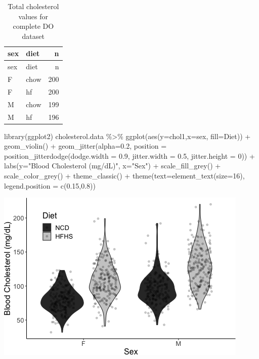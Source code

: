 \documentclass[
]{article}
\newenvironment{Shaded}{\begin{snugshade}}{\end{snugshade}}
\newcommand{\AttributeTok}[1]{\textcolor[rgb]{0.77,0.63,0.00}{#1}}
\newcommand{\DecValTok}[1]{\textcolor[rgb]{0.00,0.00,0.81}{#1}}
\newcommand{\FloatTok}[1]{\textcolor[rgb]{0.00,0.00,0.81}{#1}}
\newcommand{\FunctionTok}[1]{\textcolor[rgb]{0.00,0.00,0.00}{#1}}
\newcommand{\NormalTok}[1]{#1}
\newcommand{\SpecialCharTok}[1]{\textcolor[rgb]{0.00,0.00,0.00}{#1}}
\newcommand{\StringTok}[1]{\textcolor[rgb]{0.31,0.60,0.02}{#1}}
\begin{document}
\begin{longtable}[]{@{}llr@{}}
\caption{Total cholesterol values for complete DO
dataset}\tabularnewline
\toprule()
sex & diet & n \\
\midrule()
\endfirsthead
\toprule()
sex & diet & n \\
\midrule()
\endhead
F & chow & 200 \\
F & hf & 200 \\
M & chow & 199 \\
M & hf & 196 \\
\bottomrule()
\end{longtable}

\begin{Shaded}
\begin{Highlighting}[]
\FunctionTok{library}\NormalTok{(ggplot2)}
\NormalTok{cholesterol.data }\SpecialCharTok{\%\textgreater{}\%}
  \FunctionTok{ggplot}\NormalTok{(}\FunctionTok{aes}\NormalTok{(}\AttributeTok{y=}\NormalTok{chol1,}\AttributeTok{x=}\NormalTok{sex,}
             \AttributeTok{fill=}\NormalTok{Diet)) }\SpecialCharTok{+}
  \FunctionTok{geom\_violin}\NormalTok{() }\SpecialCharTok{+}
  \FunctionTok{geom\_jitter}\NormalTok{(}\AttributeTok{alpha=}\FloatTok{0.2}\NormalTok{,}
              \AttributeTok{position =} \FunctionTok{position\_jitterdodge}\NormalTok{(}\AttributeTok{dodge.width =} \FloatTok{0.9}\NormalTok{,}
                                              \AttributeTok{jitter.width =} \FloatTok{0.5}\NormalTok{,}
                                              \AttributeTok{jitter.height =} \DecValTok{0}\NormalTok{)) }\SpecialCharTok{+}
  \FunctionTok{labs}\NormalTok{(}\AttributeTok{y=}\StringTok{"Blood Cholesterol (mg/dL)"}\NormalTok{,}
       \AttributeTok{x=}\StringTok{"Sex"}\NormalTok{) }\SpecialCharTok{+}
  \FunctionTok{scale\_fill\_grey}\NormalTok{() }\SpecialCharTok{+}
  \FunctionTok{scale\_color\_grey}\NormalTok{() }\SpecialCharTok{+}
  \FunctionTok{theme\_classic}\NormalTok{() }\SpecialCharTok{+}
  \FunctionTok{theme}\NormalTok{(}\AttributeTok{text=}\FunctionTok{element\_text}\NormalTok{(}\AttributeTok{size=}\DecValTok{16}\NormalTok{),}
        \AttributeTok{legend.position =} \FunctionTok{c}\NormalTok{(}\FloatTok{0.15}\NormalTok{,}\FloatTok{0.8}\NormalTok{))}
\end{Highlighting}
\end{Shaded}

\includegraphics{figures/cholesterol-analysis-1.png}
\end{document}

